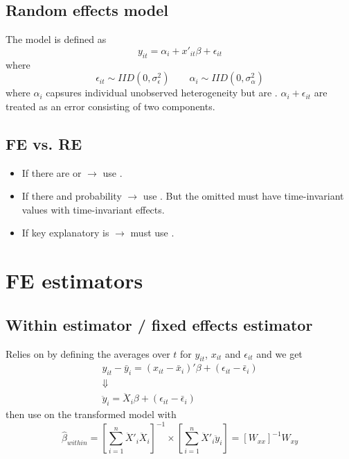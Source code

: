 \subsection{Random effects model}

The model is defined as 
\begin{equation}
    y_{it} = \alpha_i + x'_{it}\beta + \epsilon_{it}
\end{equation}
where 
\begin{equation*}
    \epsilon_{it}\sim IID(0,\sigma^2_{\epsilon})\qquad \alpha_i\sim IID(0, \sigma^2_{\alpha})
\end{equation*}
where $\alpha_i$ capsures individual unobserved heterogeneity but are .
$\alpha_i + \epsilon_{it}$ are treated as an error consisting of two components.

\subsection{FE vs. RE}

\begin{itemize}
    \item If there are  or  $\to$ use .
    \item If there  and probability  $\to$ use .
    But the omitted must have time-invariant values with time-invariant effects.
    \item If key explanatory is  $\to$ must use .
\end{itemize}

\section{FE estimators}

\subsection{Within estimator / fixed effects estimator}
Relies on  by defining the averages over $t$ for $y_{it}$, $x_{it}$ and $\epsilon_{it}$ and we get 
\begin{gather*}
    y_{it} - \bar{y}_{i} = (x_{it} - \bar{x}_i)'\beta + (\epsilon_{it} - \bar{\epsilon}_i)\\
    \Downarrow\\
    \ddot{y}_i = \ddot{X}_i\beta + (\epsilon_{it} - \bar{\epsilon}_i)
\end{gather*}
then use  on the transformed model with 
\begin{equation*}
    \hat{\beta}_{within} = \left[\sum_{i=1}^{n}\ddot{X}'_i\ddot{X}_i\right]^{-1}\times\left[\sum_{i=1}^{n}\ddot{X}'_i\ddot{y}_i\right]
    = [W_{xx}]^{-1}W_{xy}
\end{equation*}

